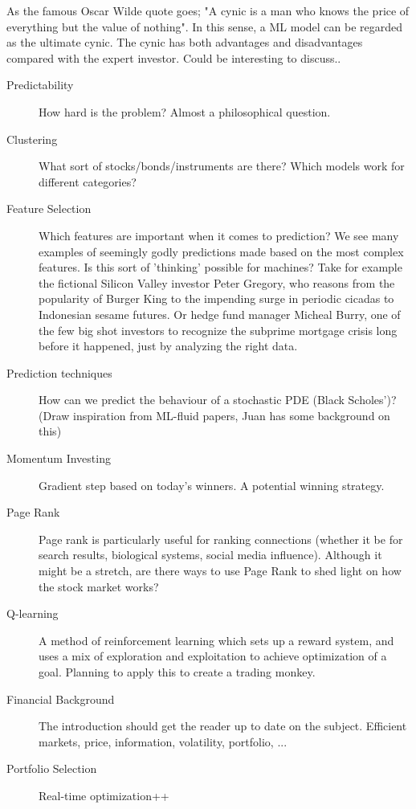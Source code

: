 \documentclass[12pt, oneside]{article}
\begin{document}
As the famous Oscar Wilde quote goes; "A cynic is a man who knows the price of everything but the value of nothing". In this sense, a ML model can be regarded as the ultimate cynic. The cynic has both advantages and disadvantages compared with the expert investor. Could be interesting to discuss..

\begin{description}

\item[Predictability] How hard is the problem? Almost a philosophical question. 

\item[Clustering] What sort of stocks/bonds/instruments are there? Which models work for different categories?

\item[Feature Selection] Which features are important when it comes to prediction? We see many examples of seemingly godly predictions made based on the most complex features. Is this sort of 'thinking' possible for machines? Take for example the fictional Silicon Valley investor Peter Gregory, who reasons from the popularity of Burger King to the impending surge in periodic cicadas to Indonesian sesame futures. Or hedge fund manager Micheal Burry, one of the few big shot investors to recognize the subprime mortgage crisis long before it happened, just by analyzing the right data.

\item[Prediction techniques] How can we predict the behaviour of a stochastic PDE (Black Scholes')? (Draw inspiration from ML-fluid papers, Juan has some background on this)

\item[Momentum Investing] Gradient step based on today's winners. A potential winning strategy.

\item[Page Rank] Page rank is particularly useful for ranking connections (whether it be for search results, biological systems, social media influence). Although it might be a stretch, are there ways to use Page Rank to shed light on how the stock market works? 

\item[Q-learning] A method of reinforcement learning which sets up a reward system, and uses a mix of exploration and exploitation to achieve optimization of a goal. Planning to apply this to create a trading monkey.

\item[Financial Background] The introduction should get the reader up to date on the subject. Efficient markets, price, information, volatility, portfolio, ...

\item[Portfolio Selection] Real-time optimization++

\end{description}
\end{document}

